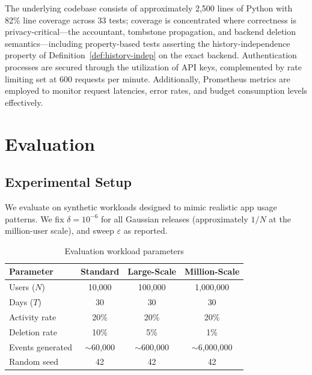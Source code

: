 \documentclass[sigconf,anonymous,review]{acmart}
\begin{document}
The underlying codebase consists of approximately 2,500 lines of Python with 82\% line coverage across 33 tests; coverage is concentrated where correctness is privacy-critical---the accountant, tombstone propagation, and backend deletion semantics---including property-based tests asserting the history-independence property of Definition~\ref{def:history-indep} on the exact backend. Authentication processes are secured through the utilization of API keys, complemented by rate limiting set at 600 requests per minute. Additionally, Prometheus metrics are employed to monitor request latencies, error rates, and budget consumption levels effectively.
\section{Evaluation}
\label{sec:evaluation}

\subsection{Experimental Setup}

We evaluate on synthetic workloads designed to mimic realistic app usage patterns. We fix $\delta = 10^{-6}$ for all Gaussian releases (approximately $1/N$ at the million-user scale), and sweep $\varepsilon$ as reported.

\begin{table}[H]
    \centering
    \caption{Evaluation workload parameters}
    \label{tab:workloads}
    \begin{tabular}{lccc}
        \toprule
        \textbf{Parameter} & \textbf{Standard} & \textbf{Large-Scale} & \textbf{Million-Scale} \\
        \midrule
        Users ($N$)        & 10,000            & 100,000              & 1,000,000              \\
        Days ($T$)         & 30                & 30                   & 30                     \\
        Activity rate      & 20\%              & 20\%                 & 20\%                   \\
        Deletion rate      & 10\%              & 5\%                  & 1\%                    \\
        Events generated   & $\sim$60,000      & $\sim$600,000        & $\sim$6,000,000        \\
        Random seed        & 42                & 42                   & 42                     \\
        \bottomrule
    \end{tabular}
\end{table}
\end{document}
